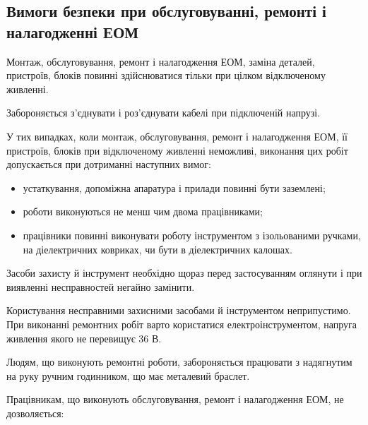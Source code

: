 \documentclass[simple,a4paper,14pt,ukrainian,utf8]{eskdtext}
\begin{document}
\begin{appendices}
            \subsection{Вимоги безпеки при обслуговуванні, ремонті і налагодженні ЕОМ}

                Монтаж, обслуговування, ремонт і налагодження ЕОМ, заміна деталей, пристроїв, блоків повинні здійснюватися тільки при цілком відключеному живленні.

                Забороняється з'єднувати і роз'єднувати кабелі при підключеній напрузі.

                У тих випадках, коли монтаж, обслуговування, ремонт і налагодження ЕОМ, її пристроїв, блоків при відключеному живленні неможливі, виконання цих робіт допускається при дотриманні наступних вимог:

                \begin{itemize}
                    \item устаткування, допоміжна апаратура і прилади повинні бути заземлені;
                    \item роботи виконуються не менш чим двома працівниками;
                    \item працівники повинні виконувати роботу інструментом з ізольованими ручками, на діелектричних ковриках, чи бути в діелектричних калошах.
                \end{itemize}

                Засоби захисту й інструмент необхідно щораз перед застосуванням оглянути і при виявленні несправностей негайно замінити.

                Користування несправними захисними засобами й інструментом неприпустимо. При виконанні ремонтних робіт варто користатися електроінструментом, напруга живлення якого не перевищує 36 В.

                Людям, що виконують ремонтні роботи, забороняється працювати з надягнутим на руку ручним годинником, що має металевий браслет.

                Працівникам, що виконують обслуговування, ремонт і налагодження ЕОМ, не дозволяється:


\end{appendices}
\end{document}
